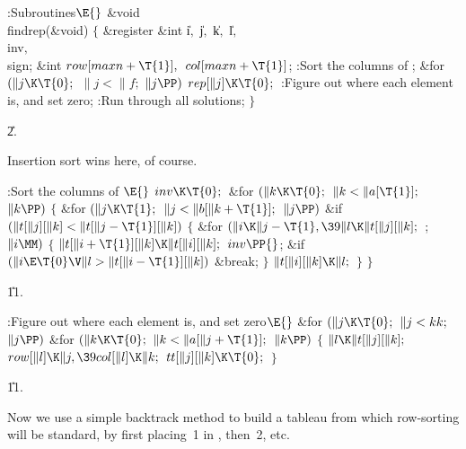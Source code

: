 \Y\B\4:Subroutines\X${}\E{}$\6
\&{void} \\{findrep}(\&{void})\6
${}\{{}$\1\6
\&{register} \&{int} \|i${},{}$ \|j${},{}$ \|k${},{}$ \|l${},{}$ \\{inv}${},{}$
\\{sign};\6
\&{int} ${}\\{row}[\\{maxn}+\T{1}],{}$ ${}\\{col}[\\{maxn}+\T{1}]{}$;\7
:Sort the columns of \X;\6
\&{for} ${}(\|j\K\T{0};{}$ ${}\|j<\|f;{}$ ${}\|j\PP){}$\1\5
${}\\{rep}[\|j]\K\T{0};{}$\2\6
:Figure out where each element is, and set  zero\X;\6
:Run through all solutions\X;\6
\4${}\}{}$\2\par
\U2.\fi

Insertion sort wins here, of course.

\Y\B\4:Sort the columns of \X${}\E{}$\6
$\\{inv}\K\T{0};{}$\6
\&{for} ${}(\|k\K\T{0};{}$ ${}\|k<\|a[\T{1}];{}$ ${}\|k\PP){}$\5
${}\{{}$\1\6
\&{for} ${}(\|j\K\T{1};{}$ ${}\|j<\|b[\|k+\T{1}];{}$ ${}\|j\PP){}$\1\6
\&{if} ${}(\|t[\|j][\|k]<\|t[\|j-\T{1}][\|k]){}$\5
${}\{{}$\1\6
\&{for} ${}(\|i\K\|j-\T{1},\39\|l\K\|t[\|j][\|k];{}$  ; ${}\|i\MM){}$\5
${}\{{}$\1\6
${}\|t[\|i+\T{1}][\|k]\K\|t[\|i][\|k];{}$\6
${}\\{inv}\PP{}$;\6
\&{if} ${}(\|i\E\T{0}\V\|l>\|t[\|i-\T{1}][\|k]){}$\1\5
\&{break};\2\6
\4${}\}{}$\2\6
${}\|t[\|i][\|k]\K\|l;{}$\6
\4${}\}{}$\2\2\6
\4${}\}{}$\2\par
\U11.\fi

\B{}:Figure out where each element is, and set  zero\X${}\E{}$\6
\&{for} ${}(\|j\K\T{0};{}$ ${}\|j<\\{kk};{}$ ${}\|j\PP){}$\1\6
\&{for} ${}(\|k\K\T{0};{}$ ${}\|k<\|a[\|j+\T{1}];{}$ ${}\|k\PP){}$\5
${}\{{}$\1\6
${}\|l\K\|t[\|j][\|k];{}$\6
${}\\{row}[\|l]\K\|j,\39\\{col}[\|l]\K\|k;{}$\6
${}\\{tt}[\|j][\|k]\K\T{0};{}$\6
\4${}\}{}$\2\2\par
\U11.\fi

Now we use a simple backtrack method to build a tableau
 from which
row-sorting will be standard, by first placing~1 in , then~2, etc.

